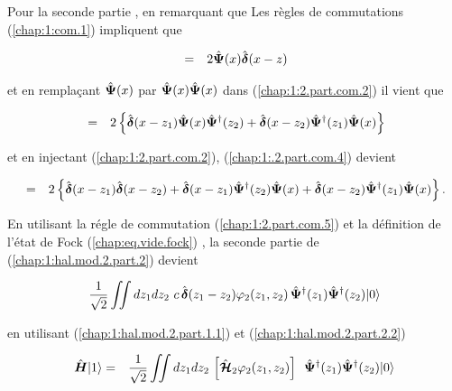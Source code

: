 Pour la seconde partie  , en remarquant que Les règles de commutations (\ref{chap:1:com.1}) impliquent que 

\begin{eqnarray}
	[ \operator{\Psi}(x) \operator{\Psi}(x),  \operator{\Psi}^\dag(z) ] & =& 2\operator{\Psi}(x)\operator{\delta}(x - z)\label{chap:1:com.3}  		
\end{eqnarray}

et en remplaçant $\hat{\bm{\Psi}}(x)$ par $\hat{\bm{\Psi}}(x)\hat{\bm{\Psi}}(x)$ dans  (\ref{chap:1:2.part.com.2}) il vient que  

\begin{eqnarray}
	[ \operator{\Psi}(x)\operator{\Psi}(x),  \operator{\Psi}^\dag(z_1) \operator{\Psi}^\dag(z_2)  ]  &=&  2 \left \{   \operator{\delta}(x-z_1)\operator{\Psi}(x)\operator{\Psi}^\dag(z_2)  + \operator{\delta}(x-z_2)\operator{\Psi}^\dag(z_1)  \operator{\Psi}(x)\right \} \label{chap:1:.2.part.com.4}		
\end{eqnarray}

et en injectant (\ref{chap:1:2.part.com.2}),  (\ref{chap:1:.2.part.com.4}) devient 

\begin{eqnarray}
	[ \operator{\Psi}(x)\operator{\Psi}(x),  \operator{\Psi}^\dag(z_1)\operator{\Psi}^\dag(z_2)  ]  &=& 2 \left \{\operator{\delta}(x-z_1)\operator{\delta}(x-z_2) +   \operator{\delta}(x-z_1)\operator{\Psi}^\dag(z_2)\operator{\Psi}(x)  + \operator{\delta}(x-z_2)\operator{\Psi}^\dag(z_1)  \operator{\Psi}(x)\right \} \label{chap:1:2.part.com.5}	.	
\end{eqnarray}

En utilisant la régle de commutation (\ref{chap:1:2.part.com.5}) et la définition de l'état de Fock (\ref{chap:eq.vide.fock}) , la seconde partie de (\ref{chap:1:hal.mod.2.part.2}) devient

\begin{eqnarray}
	 \frac{1}{ \sqrt{2}}  \iint dz_1 dz_2 \,  \,c \, \hat{\bm{\delta}}(z_1 - z_2)  \varphi_2(z_1, z_2) \, \hat{\bm{\Psi}}^\dag(z_1) \hat{\bm{\Psi}}^\dag(z_2) \vert 0 \rangle \label{chap:1:hal.mod.2.part.2.2}	
\end{eqnarray} 

en utilisant (\ref{chap:1:hal.mod.2.part.1.1}) et (\ref{chap:1:hal.mod.2.part.2.2}) 

\begin{eqnarray}
	\operator{H}\vert 1 \rangle &= &  \frac{1}{ \sqrt{2}}  \iint dz_1 dz_2 \,  	\left [ \operator{\mathcal{H}}_2 \varphi_2(z_1, z_2) \right ] \, \operator{\Psi}^\dag(z_1) \operator{\Psi}^\dag(z_2) \vert 0 \rangle		
\end{eqnarray}

